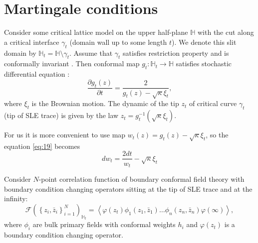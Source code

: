 \documentclass{jetpl}
\begin{document}
\section{Martingale conditions}
\label{sec:mart-cond}


 Consider some critical lattice model on the upper half-plane $\mathbb{H}$ with the cut along a critical interface $\gamma_{t}$ (domain wall up to some length $t$). We denote this slit domain by $\mathbb{H}_{t}=\mathbb{H}\setminus \gamma_{t}$.  Assume that $\gamma_{t}$ satisfies restriction property and is conformally  invariant \cite{Cardy:2005kh}. Then  conformal map  $g_{t}:\mathbb{H}_{t}\to \mathbb{H}$ satisfies stochastic differential equation \cite{schramm2000scaling}:
\begin{equation}
\label{eq:19}
  \frac{\partial g_t(z)}{\partial t} = \frac{ 2}{g_t(z)-\sqrt{\kappa}\xi_{t}} ,
\end{equation}
where $\xi_{t}$ is the Brownian motion. The dynamic of the tip $z_{t}$ of critical curve $\gamma_{t}$ (tip of SLE trace) is given by the law $z_{t}=g_{t}^{-1}(\sqrt{\kappa}\xi_{t})$. 

For us it is more convenient to use map $w_{t} (z)=g_{t}(z)-\sqrt{\kappa}\xi_{t}$, so the equation \eqref{eq:19} becomes
\begin{equation}
  \label{eq:20}
       d w _{t}= \frac{2dt}{w_{t} }-\sqrt{\kappa}\xi_{t}  
\end{equation}

Consider  $N$-point correlation function of boundary conformal field theory with boundary condition changing operators sitting at the tip of SLE trace and at the infinity:
\begin{equation}
  \mathcal{F}(\left\{z_{i},\bar z_{i}\right\}_{i=1}^{N})_{\mathbb{H}_{t}}=
\left<\varphi(z_{t}) \phi_{1}(z_{1},\bar z_{1}) \dots \phi_{n}(z_{n},\bar z_{n})
      \varphi(\infty)\right>,
    \label{eq:2}
\end{equation}
where $\phi_{i}$ are bulk primary fields with conformal weights $h_i$ and $\varphi(z_{t})$ is a boundary condition changing operator.
\end{document}
